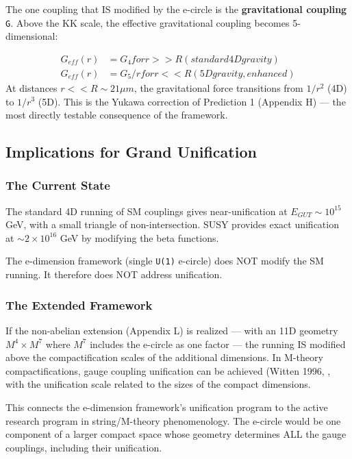 \documentclass[aps,prd,preprint,superscriptaddress,longbibliography,floatfix]{revtex4-2}
\theoremstyle{remark}
\begin{document}
The one coupling that IS modified by the e-circle is the \textbf{gravitational coupling} \texttt{G}. Above the KK scale, the effective gravitational coupling becomes 5-dimensional:


\begin{align}
    G_{eff}(r) &= G_{4} for r >> R (standard 4D gravity) \\
    G_{eff}(r) &= G_{5}/r for r << R (5D gravity, enhanced)
\end{align}
At distances $r << R \sim  21 \mu m$, the gravitational force transitions from $1/r^{2}$ (4D) to $1/r^{3}$ (5D). This is the Yukawa correction of Prediction 1 (Appendix H) --- the most directly testable consequence of the framework.



\subsection{Implications for Grand Unification}


\subsubsection{The Current State}

The standard 4D running of SM couplings gives near-unification at $E_{GUT} \sim  10^{15}$ GeV, with a small triangle of non-intersection. SUSY provides exact unification at $\sim 2 \times 10^{16}$ GeV by modifying the beta functions.

The e-dimension framework (single \texttt{U(1)} e-circle) does NOT modify the SM running. It therefore does NOT address unification.


\subsubsection{The Extended Framework}

If the non-abelian extension (Appendix L) is realized --- with an 11D geometry $M^{4} \times M^{7}$ where $M^{7}$ includes the e-circle as one factor --- the running IS modified above the compactification scales of the additional dimensions. In M-theory compactifications, gauge coupling unification can be achieved (Witten 1996, \cite{HoravaWitten1996}, with the unification scale related to the sizes of the compact dimensions.

This connects the e-dimension framework's unification program to the active research program in string/M-theory phenomenology. The e-circle would be one component of a larger compact space whose geometry determines ALL the gauge couplings, including their unification.
\end{document}
